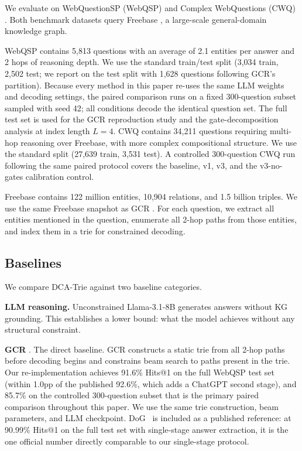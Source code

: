 We evaluate on WebQuestionSP (WebQSP) \citep{yih2016websqp} and Complex WebQuestions
(CWQ) \citep{talmor2018cwq}. Both benchmark datasets query Freebase
\citep{bollacker2008freebase}, a large-scale general-domain knowledge graph.

WebQSP contains 5,813 questions with an average of 2.1 entities per answer and 2 hops
of reasoning depth. We use the standard train/test split (3,034 train, 2,502 test; we
report on the test split with 1,628 questions following GCR's partition). Because every
method in this paper re-uses the same LLM weights and decoding settings, the paired
comparison runs on a fixed 300-question subset sampled with seed 42; all conditions
decode the identical question set. The full test set is used for the GCR reproduction
study and the gate-decomposition analysis at index length $L{=}4$. CWQ contains 34,211
questions requiring multi-hop reasoning over Freebase, with more complex compositional
structure. We use the standard split (27,639 train, 3,531 test). A controlled
300-question CWQ run following the same paired protocol covers the baseline, v1, v3, and
the v3-no-gates calibration control.

Freebase contains 122 million entities, 10,904 relations, and 1.5 billion triples. We
use the same Freebase snapshot as GCR \citep{luo2025-graph-constrained-reasoning}. For
each question, we extract all entities mentioned in the question, enumerate all 2-hop
paths from those entities, and index them in a trie for constrained decoding.

\subsection{Baselines}
\label{sec:baselines}

We compare DCA-Trie against two baseline categories.

\textbf{LLM reasoning.} Unconstrained Llama-3.1-8B \citep{touvron2023llama} generates
answers without KG grounding. This establishes a lower bound: what the model achieves
without any structural constraint.

\textbf{GCR} \citep{luo2025-graph-constrained-reasoning}. The direct baseline. GCR
constructs a static trie from all 2-hop paths before decoding begins and constrains
beam search to paths present in the trie. Our re-implementation achieves 91.6\% Hits@1
on the full WebQSP test set (within 1.0pp of the published 92.6\%, which adds a ChatGPT
second stage), and 85.7\% on the controlled 300-question subset that is the primary
paired comparison throughout this paper. We use the same trie construction, beam
parameters, and LLM checkpoint. DoG~\citep{li2024-decoding-on-graphs} is included as a
published reference: at 90.99\% Hits@1 on the full test set with single-stage answer
extraction, it is the one official number directly comparable to our single-stage
protocol.

